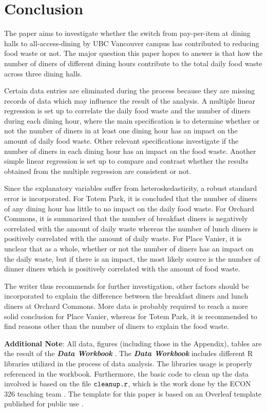\section{Conclusion}
The paper aims to investigate whether the switch from pay-per-item at dining halls to all-access-dining by UBC Vancouver campus has contributed to reducing food waste or not. The major question this paper hopes to answer is that how the number of diners of different dining hours contribute to the total daily food waste across three dining halls.

Certain data entries are eliminated during the process because they are missing records of data which may influence the result of the analysis. A multiple linear regression is set up to correlate the daily food waste and the number of diners during each dining hour, where the main specification is to determine whether or not the number of diners in at least one dining hour has an impact on the amount of daily food waste. Other relevant specifications investigate if the number of diners in each dining hour has an impact on the food waste. Another simple linear regression is set up to compare and contrast whether the results obtained from the multiple regression are consistent or not.

Since the explanatory variables suffer from heteroskedasticity, a robust standard error is incorporated. For Totem Park, it is concluded that the number of diners of any dining hour has little to no impact on the daily food waste. For Orchard Commons, it is summarized that the number of breakfast diners is negatively correlated with the amount of daily waste whereas the number of lunch diners is positively correlated with the amount of daily waste. For Place Vanier, it is unclear that as a whole, whether or not the number of diners has an impact on the daily waste, but if there is an impact, the most likely source is the number of dinner diners which is positively correlated with the amount of food waste.

The writer thus recommends for further investigation, other factors should be incorporated to explain the difference between the breakfast diners and lunch diners at Orchard Commons. More data is probably required to reach a more solid conclusion for Place Vanier, whereas for Totem Park, it is recommended to find reasons other than the number of diners to explain the food waste.

\bigskip
\textbf{Additional Note}: All data, figures (including those in the Appendix), tables are the result of the \textbf{\textit{Data Workbook}} \citep{data_workbook}. The \textbf{\textit{Data Workbook}} includes different R libraries utilized in the process of data analysis. The libraries usage is properly referenced in the workbook. Furthermore, the basic code to clean up the data involved is based on the file $\verb|cleanup.r|$, which is the work done by the ECON 326 teaching team \citep{cleanup}. The template for this paper is based on an Overleaf template published for public use \citep{template}.

\newpage